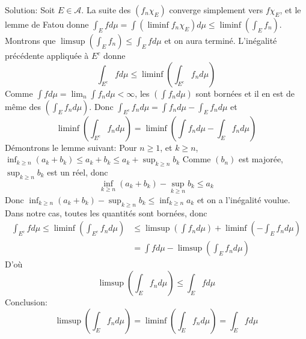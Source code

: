 \documentclass{report}
\begin{document}
Solution: Soit $E\in \mathcal A$. La suite des $(f_n\chi_E)$ converge simplement vers $f\chi_E$, et le lemme de Fatou donne $\int_E f d\mu = \int \left(\liminf f_n\chi_E\right) d\mu \leq \liminf\left(\int_E f_n \right)$.\newline
Montrons que $\limsup \left(\int_E f_n \right) \leq \int_E f d\mu$ et on aura terminé.\newline
L'inégalité précédente appliquée à $E^c$ donne $$\int_{E^c} f d\mu \leq \liminf\left(\int_{E^c} f_n d\mu \right)$$\newline
Comme $\int f d\mu = \lim_n \int f_n d\mu <\infty$, les $\left(\int f_n d\mu\right)$ sont bornées et il en est de même des  $\left(\int_E f_n d\mu\right)$.\newline
Donc $\int_{E^c} f_n d\mu = \int f_n d\mu - \int_E f_n d\mu$ et \newline
$$\liminf\left(\int_{E^c} f_n d\mu \right) = \liminf \left( \int f_n d\mu - \int_E f_n d\mu \right)$$
Démontrons le lemme suivant:\newline \newline
{}
\newline \newline
Pour $n\geq 1$, et $k\geq n$, $\inf_{k\geq n} (a_k+b_k)\leq a_k + b_k \leq a_k + \sup_{k\geq n} b_k$\newline
Comme $(b_n)$ est majorée, $\sup_{k\geq n} b_k$ est un réel, donc $$\inf_{k\geq n} (a_k+b_k) - \sup_{k\geq n} b_k \leq a_k$$\newline
Donc $\inf_{k\geq n} (a_k+b_k) - \sup_{k\geq n} b_k \leq \inf_{k\geq n} a_k$ et on a l'inégalité voulue.\newline \newline
Dans notre cas, toutes les quantités sont bornées, donc \newline
$$\begin{aligned}\int_{E^c}f d\mu \leq \liminf\left(\int_{E^c} f_n d\mu \right)&\leq \limsup \left(\int f_n d\mu \right) + \liminf \left(-\int_E f_n d\mu\right)\\
&= \int f d\mu - \limsup \left( \int_E f_n d\mu\right)
\end{aligned}$$
D'où $$\limsup \left( \int_E f_n d\mu\right)\leq \int_E f d\mu$$
Conclusion: $$\limsup \left( \int_E f_n d\mu\right)= \liminf\left( \int_E f_n d\mu\right)= \int_E f d\mu$$
\end{document}

